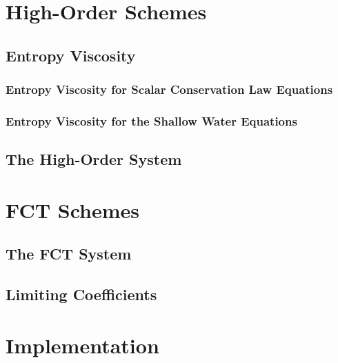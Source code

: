 \section{High-Order Schemes}  
\subsection{Entropy Viscosity\label{sec:entropy_viscosity}}
  \subsubsection{Entropy Viscosity for Scalar Conservation Law Equations
    \label{sec:entropy_viscosity_scalar}}
    
  \subsubsection{Entropy Viscosity for the Shallow Water Equations
    \label{sec:shallowwater_entropy_viscosity}}
    
\subsection{The High-Order System}
  
\section{FCT Schemes}  
\subsection{The FCT System}
  
\subsection{Limiting Coefficients\label{sec:limiting_coefficients}}
  
  
  
  
\section{Implementation}  
